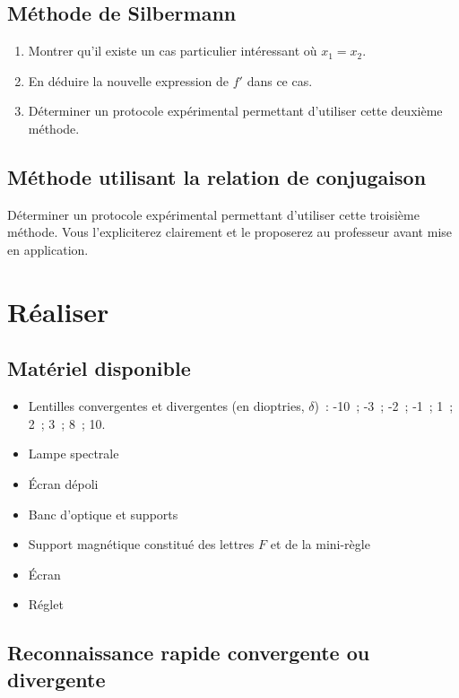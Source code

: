 \documentclass[a4paper, 12pt, final, garamond]{book}
\begin{document}
\subsection{Méthode de Silbermann}

\begin{enumerate}
    \item Montrer qu'il existe un cas particulier intéressant où $x_1=x_2$. 
    \item En déduire la nouvelle expression de $f'$ dans ce cas. 
    \item Déterminer un protocole expérimental permettant d'utiliser cette
        deuxième méthode.
\end{enumerate}

\subsection{Méthode utilisant la relation de conjugaison}

Déterminer un protocole expérimental permettant d'utiliser cette troisième
méthode. Vous l'expliciterez clairement et le proposerez au professeur avant
mise en application. 

\section{Réaliser}

\subsection{Matériel disponible}

\begin{itemize}
    \item Lentilles convergentes et divergentes (en dioptries, $\delta$)~: -10~;
        -3~; -2~; -1~; 1~; 2~; 3~; 8~; 10.
    \item Lampe spectrale
    \item Écran dépoli
    \item Banc d'optique et supports
    \item Support magnétique constitué des lettres $F$ et de la mini-règle 
    \item Écran 
    \item Réglet
\end{itemize}

\subsection{Reconnaissance rapide convergente ou divergente}
	
\end{document}
